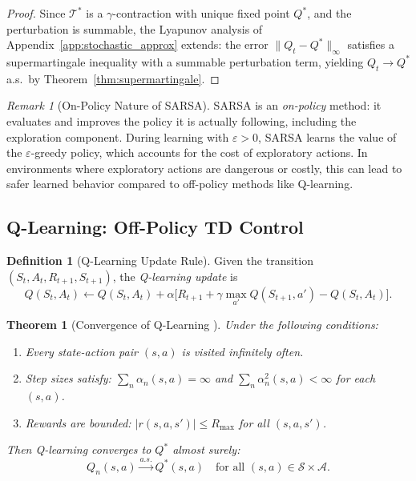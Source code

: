 \documentclass[11pt,a4paper]{article}
\theoremstyle{definition}
\newtheorem{definition}{Definition}[section]
\theoremstyle{plain}
\newtheorem{theorem}{Theorem}[section]
\theoremstyle{remark}
\newtheorem{remark}{Remark}[section]
\begin{document}
\begin{proof}
Since $\mathcal{T}^*$ is a $\gamma$-contraction with unique fixed point $Q^*$, and the perturbation is summable, the Lyapunov analysis of Appendix~\ref{app:stochastic_approx} extends: the error $\|Q_t - Q^*\|_\infty$ satisfies a supermartingale inequality with a summable perturbation term, yielding $Q_t \to Q^*$ a.s.\ by Theorem~\ref{thm:supermartingale}.
\end{proof}

\begin{remark}[On-Policy Nature of SARSA]
\label{rem:sarsa_on_policy}
SARSA is an \emph{on-policy} method: it evaluates and improves the policy it is actually following, including the exploration component. During learning with $\varepsilon > 0$, SARSA learns the value of the $\varepsilon$-greedy policy, which accounts for the cost of exploratory actions. In environments where exploratory actions are dangerous or costly, this can lead to safer learned behavior compared to off-policy methods like Q-learning.
\end{remark}

\subsection{Q-Learning: Off-Policy TD Control}
\label{subsec:qlearning}

\begin{definition}[Q-Learning Update Rule]
\label{def:qlearning}
Given the transition $(S_t, A_t, R_{t+1}, S_{t+1})$, the \emph{Q-learning update} is
\begin{equation}
    Q(S_t, A_t) \leftarrow Q(S_t, A_t) + \alpha\bigl[R_{t+1} + \gamma \max_{a'} Q(S_{t+1}, a') - Q(S_t, A_t)\bigr].
    \label{eq:qlearning}
\end{equation}
\end{definition}

\begin{keyresult}
\begin{theorem}[Convergence of Q-Learning {\cite{watkins1992}}]
\label{thm:qlearning_convergence}
Under the following conditions:
\begin{enumerate}[nosep]
    \item Every state-action pair $(s,a)$ is visited infinitely often.
    \item Step sizes satisfy: $\sum_{n} \alpha_n(s,a) = \infty$ and $\sum_{n} \alpha_n^2(s,a) < \infty$ for each $(s,a)$.
    \item Rewards are bounded: $|r(s,a,s')| \leq R_{\max}$ for all $(s,a,s')$.
\end{enumerate}
Then Q-learning converges to $Q^*$ almost surely:
\begin{equation}
    Q_n(s,a) \xrightarrow{a.s.} Q^*(s,a) \quad \text{for all } (s,a) \in \mathcal{S} \times \mathcal{A}.
\end{equation}
\end{theorem}
\end{keyresult}
\end{document}
